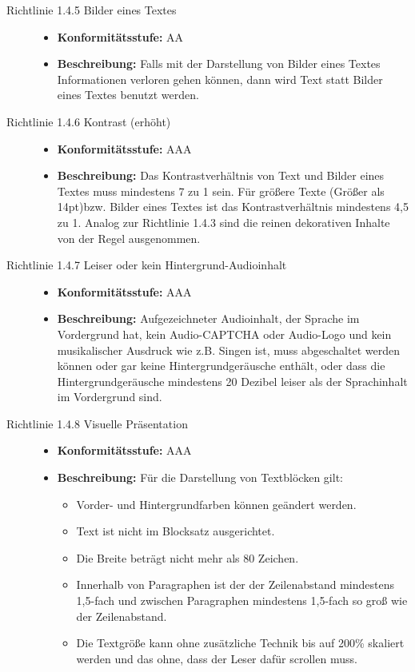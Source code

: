 \begin{description}
\begin{description}
		\item[Richtlinie 1.4.5 Bilder eines Textes]\hfill
		\begin{itemize}
			\item \textbf{Konformitätsstufe:} AA
			\item \textbf{Beschreibung:} Falls mit der Darstellung von Bilder eines Textes Informationen verloren gehen können, dann wird Text statt Bilder eines Textes 
			benutzt werden.
		\end{itemize}
		
		\item[Richtlinie 1.4.6 Kontrast (erhöht)]\hfill
		\begin{itemize}
			\item \textbf{Konformitätsstufe:} AAA
			\item \textbf{Beschreibung:} Das Kontrastverhältnis von Text und Bilder eines Textes muss mindestens 7 zu 1 sein. Für größere Texte (Größer als 14pt)bzw. 
			Bilder eines Textes ist das Kontrastverhältnis mindestens 4,5 zu 1. Analog zur Richtlinie 1.4.3 sind die reinen dekorativen Inhalte von 
			der Regel ausgenommen.
		\end{itemize}
		
		\item[Richtlinie 1.4.7 Leiser oder kein Hintergrund-Audioinhalt]\hfill
		\begin{itemize}
			\item \textbf{Konformitätsstufe:} AAA
			\item \textbf{Beschreibung:} Aufgezeichneter Audioinhalt, der Sprache im Vordergrund hat, kein Audio-CAPTCHA oder Audio-Logo und kein musikalischer Ausdruck
			wie z.B. Singen ist, muss abgeschaltet werden können oder gar keine Hintergrundgeräusche enthält, oder dass die Hintergrundgeräusche mindestens 20 Dezibel 
			leiser als der Sprachinhalt im Vordergrund sind.
		\end{itemize}
		
		\item[Richtlinie 1.4.8 Visuelle Präsentation]\hfill
		\begin{itemize}
			\item \textbf{Konformitätsstufe:} AAA
			\item \textbf{Beschreibung:} Für die Darstellung von Textblöcken gilt:
			\begin{itemize}
				\item Vorder- und Hintergrundfarben können geändert werden.
				\item Text ist nicht im Blocksatz ausgerichtet.
				\item Die Breite beträgt nicht mehr als 80 Zeichen.
				\item Innerhalb von Paragraphen ist der der Zeilenabstand mindestens 1,5-fach und zwischen Paragraphen mindestens 1,5-fach so 
				groß wie der Zeilenabstand.
				\item Die Textgröße kann ohne zusätzliche Technik bis auf 200\% skaliert werden und das ohne, dass der Leser dafür scrollen muss.
			\end{itemize}
		\end{itemize}
		

\end{description}
\end{description}
